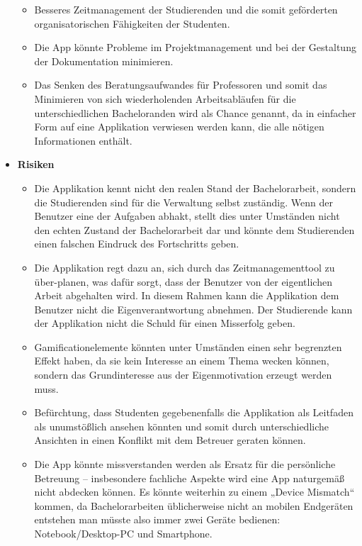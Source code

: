 \documentclass{scrreprt}
\begin{document}
\begin{itemize}
\begin{itemize}
\item Besseres Zeitmanagement der Studierenden und die somit geförderten organisatorischen Fähigkeiten der Studenten.
\item Die App könnte Probleme im Projektmanagement und bei der Gestaltung der Dokumentation minimieren.
\item Das Senken des Beratungsaufwandes für Professoren und somit das Minimieren von sich wiederholenden Arbeitsabläufen für die unterschiedlichen Bacheloranden wird als Chance genannt, da in einfacher Form auf eine Applikation verwiesen werden kann, die alle nötigen Informationen enthält.
\end{itemize}

\item \textbf{Risiken}
\begin{itemize}
\item Die Applikation kennt nicht den realen Stand der Bachelorarbeit, sondern die Studierenden sind für die Verwaltung selbst zuständig. Wenn der Benutzer eine der Aufgaben abhakt, stellt dies unter Umständen nicht den echten Zustand der Bachelorarbeit dar und könnte dem Studierenden einen falschen Eindruck des Fortschritts geben.
\item Die Applikation regt dazu an, sich durch das Zeitmanagementtool zu über-planen, was dafür sorgt, dass der Benutzer von der eigentlichen Arbeit abgehalten wird. In diesem Rahmen kann die Applikation dem Benutzer nicht die Eigenverantwortung abnehmen. Der Studierende kann der Applikation nicht die Schuld für einen Misserfolg geben.
\item Gamificationelemente könnten unter Umständen einen sehr begrenzten Effekt haben, da sie kein Interesse an einem Thema wecken können, sondern das Grundinteresse aus der Eigenmotivation erzeugt werden muss.
\item Befürchtung, dass Studenten gegebenenfalls die Applikation als Leitfaden als unumstößlich ansehen könnten und somit durch unterschiedliche Ansichten in einen Konflikt mit dem Betreuer geraten können.
\item Die App könnte missverstanden werden als Ersatz für die persönliche Betreuung – insbesondere fachliche Aspekte wird eine App naturgemäß nicht abdecken können. Es könnte weiterhin zu einem „Device Mismatch“ kommen, da Bachelorarbeiten üblicherweise nicht an mobilen Endgeräten entstehen man müsste also immer zwei Geräte bedienen: Notebook/Desktop-PC und Smartphone.

\end{itemize}

\end{itemize}
\end{document}
